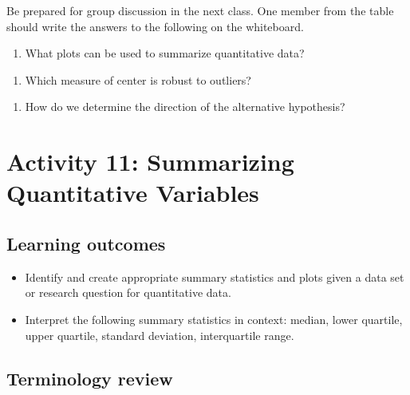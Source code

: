 \documentclass[
]{report}
\providecommand{\tightlist}{%
  \setlength{\itemsep}{0pt}\setlength{\parskip}{0pt}}
\begin{document}
Be prepared for group discussion in the next class. One member from the table should write the answers to the following on the whiteboard.

\begin{enumerate}
\def\labelenumi{\arabic{enumi}.}
\tightlist
\item
  What plots can be used to summarize quantitative data?
\end{enumerate}

\vspace{0.7in}

\begin{enumerate}
\def\labelenumi{\arabic{enumi}.}
\setcounter{enumi}{1}
\tightlist
\item
  Which measure of center is robust to outliers?
\end{enumerate}

\vspace{0.2in}

\begin{enumerate}
\def\labelenumi{\arabic{enumi}.}
\setcounter{enumi}{2}
\tightlist
\item
  How do we determine the direction of the alternative hypothesis?
\end{enumerate}

\newpage

\section{Activity 11: Summarizing Quantitative Variables}\label{activity-11-summarizing-quantitative-variables}


\subsection{Learning outcomes}\label{learning-outcomes-11}

\begin{itemize}
\item
  Identify and create appropriate summary statistics and plots given a data set or research question for quantitative data.
\item
  Interpret the following summary statistics in context:
  median, lower quartile, upper quartile,
  standard deviation, interquartile range.
\end{itemize}

\subsection{Terminology review}\label{terminology-review-9}
\end{document}
